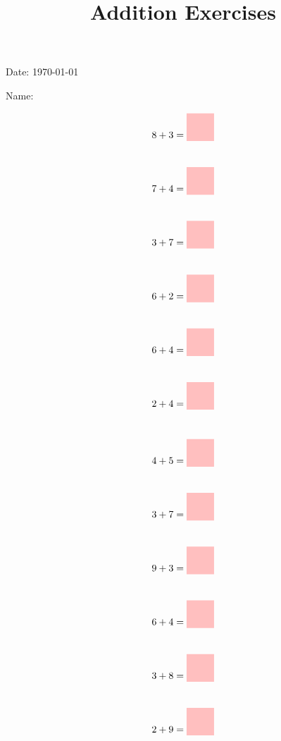 \documentclass[14pt]{extarticle}
\title{Addition Exercises}
\author{}
\date{}
\newcommand{\blankbox}{\colorbox{pink}{\rule{22pt}{0pt}\rule{0pt}{22pt}}}
\begin{document}
\maketitle

\Large
\noindent Date: \today
\vspace{1cm}

\noindent Name: \underline{\hspace{6cm}}
\vspace{1cm}

\huge
\begin{multicols}{2}
\noindent\begin{align*}
    8 + 3 &= \blankbox \\[22pt]
    7 + 4 &= \blankbox \\[22pt]
    3 + 7 &= \blankbox \\[22pt]
    6 + 2 &= \blankbox \\[22pt]
    6 + 4 &= \blankbox \\[22pt]
    2 + 4 &= \blankbox \\[22pt]
\end{align*}
\columnbreak
\noindent\begin{align*}
    4 + 5 &= \blankbox \\[22pt]
    3 + 7 &= \blankbox \\[22pt]
    9 + 3 &= \blankbox \\[22pt]
    6 + 4 &= \blankbox \\[22pt]
    3 + 8 &= \blankbox \\[22pt]
    2 + 9 &= \blankbox \\[22pt]
\end{align*}
\end{multicols}

\end{document}
